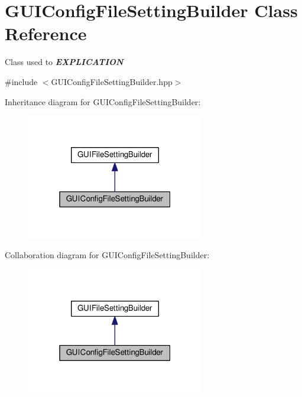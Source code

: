 \hypertarget{class_g_u_i_config_file_setting_builder}{}\section{G\+U\+I\+Config\+File\+Setting\+Builder Class Reference}
\label{class_g_u_i_config_file_setting_builder}


Class used to {\itshape {\bfseries E\+X\+P\+L\+I\+C\+A\+T\+I\+ON}}  




{\ttfamily \#include $<$G\+U\+I\+Config\+File\+Setting\+Builder.\+hpp$>$}



Inheritance diagram for G\+U\+I\+Config\+File\+Setting\+Builder\+:
\nopagebreak
\begin{figure}[H]
\begin{center}
\leavevmode
\includegraphics[width=220pt]{class_g_u_i_config_file_setting_builder__inherit__graph}
\end{center}
\end{figure}


Collaboration diagram for G\+U\+I\+Config\+File\+Setting\+Builder\+:
\nopagebreak
\begin{figure}[H]
\begin{center}
\leavevmode
\includegraphics[width=220pt]{class_g_u_i_config_file_setting_builder__coll__graph}
\end{center}
\end{figure}

